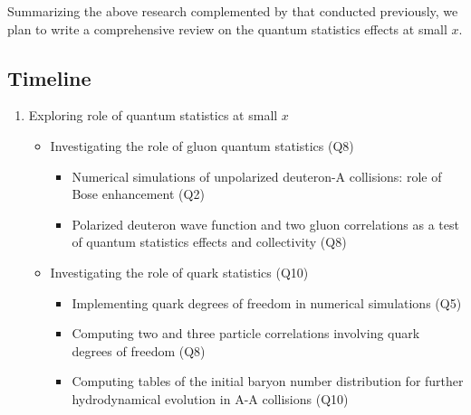 		
		Summarizing the above research complemented by that conducted previously, 
		we plan to write a comprehensive review on the quantum statistics effects at small $x$. 


    \vspace{0.5em}
    \subsection{Timeline}
        \label{sec:p32}
        \begin{enumerate}
            \item Exploring role of quantum statistics at small $x$
                \begin{itemize}
                    \item Investigating the role of gluon quantum statistics (Q8)
                        \begin{itemize}
                            \item Numerical simulations of unpolarized deuteron-A collisions: role of Bose enhancement (Q2) 
                            \item Polarized deuteron wave function and two gluon correlations as a test of quantum 
								statistics effects and collectivity (Q8) 
                        \end{itemize}
                    \item Investigating the role of quark statistics (Q10)
                        \begin{itemize}
                            \item Implementing quark degrees of freedom in numerical simulations (Q5)
                            \item Computing two and three particle correlations involving quark degrees of freedom (Q8)
                            \item Computing tables of the initial baryon number distribution for further hydrodynamical evolution in A-A collisions   (Q10)
                        \end{itemize}
                \end{itemize}
        \end{enumerate}


